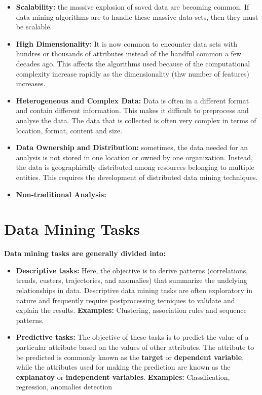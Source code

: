 	\begin{itemize}
		\item {\bf Scalability:} the massive explosion of saved data are becoming common. If data mining 
		algorithms are to handle these massive data sets, then they must be scalable.
		\item {\bf High Dimensionality:} It is now common to encounter data sets with hundres or thousands 
		of attributes instead of the handful common a few decades ago. This affects the algorithms used 
		because of the computational complexity increase rapidly as the dimensionality (thw number of 
		features) increases.
		\item {\bf Heterogeneous and Complex Data:} Data is often in a different format and contain different
		information. This makes it difficult to preprocess and analyse the data. The data that is collected is
		often very complex in terms of location, format, content and size. 
		\item {\bf Data Ownership and Distribution:} sometimes, the data needed for an analysis is not 
		stored in one location or owned by one organization. Instead, the data is geographically distributed 
		among resources belonging to multiple entities. This requires the development of distributed
		data mining techniques. 
		\item {\bf Non-traditional Analysis:} 
	\end{itemize}

\clearpage
\section{Data Mining Tasks}
	
	{\bf Data mining tasks are generally divided into:}

	\begin{itemize}
		\item {\bf Descriptive tasks:} Here, the objective is to derive patterns 
		(correlations, trends, custers, trajectories, and anomalies) that summarize the undelying relationships in data. Descriptive data mining tasks are often exploratory in nature 
		and frequently require postprocessing tecniques to validate and explain the results. 
		{\bf Examples:} {\color{blue} Clustering, association rules and sequence patterns.}
		\item {\bf Predictive tasks:}  The objective of these tasks is to predict 
		the value of a particular attribute based on the values of other attributes. 
		The attribute to be predicted is commonly known as the {\bf target} or 
		{\bf dependent variable}, while the attributes used for making the prediction are 
		known as the {\bf explanatoy} or {\bf independent variables}. 
		{\bf Examples: }{\color{blue} Classification, regression, anomalies detection} 
	\end{itemize}

